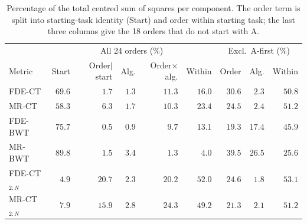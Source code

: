 \begin{table}[!t]
\centering
\caption{Percentage of the total centred sum of squares per component. The order term is split into starting-task identity (Start) and order within starting task; the last three columns give the 18 orders that do not start with A.}
\label{tab:decomposition}
\setlength{\tabcolsep}{1.8pt}
\footnotesize
\begin{tabular*}{\columnwidth}{@{\extracolsep{\fill}}lrrrrrrrr@{}}
\toprule
 & \multicolumn{5}{c}{All 24 orders (\%)} & \multicolumn{3}{c}{Excl.\ A-first (\%)} \\
\cmidrule(lr){2-6}\cmidrule(lr){7-9}
Metric & Start & \shortstack{Order$\mid$\\start} & Alg. & \shortstack{Order$\times$\\alg.} & Within & Order & Alg. & Within \\
\midrule
FDE-CT & $69.6$ & $1.7$ & $1.3$ & $11.3$ & $16.0$ & $30.6$ & $2.3$ & $50.8$ \\
MR-CT & $58.3$ & $6.3$ & $1.7$ & $10.3$ & $23.4$ & $24.5$ & $2.4$ & $51.2$ \\
FDE-BWT & $75.7$ & $0.5$ & $0.9$ & $9.7$ & $13.1$ & $19.3$ & $17.4$ & $45.9$ \\
MR-BWT & $89.8$ & $1.5$ & $3.4$ & $1.3$ & $4.0$ & $39.5$ & $26.5$ & $25.6$ \\
\midrule
FDE-CT$_{2:N}$ & $4.9$ & $20.7$ & $2.3$ & $20.2$ & $52.0$ & $24.6$ & $1.8$ & $53.1$ \\
MR-CT$_{2:N}$ & $7.9$ & $15.9$ & $2.8$ & $24.3$ & $49.2$ & $21.3$ & $2.1$ & $51.2$ \\
\bottomrule
\end{tabular*}
\end{table}
